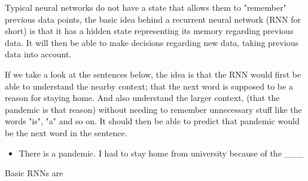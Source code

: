 
Typical neural networks do not have a state that allows them to "remember" previous data points, the basic idea behind a recurrent neural network (RNN for short) is that it has a hidden state representing its memory regarding previous data. It will then be able to make decisions regarding new data, taking previous data into account.

If we take a look at the sentences below, the idea is that the RNN would first be able to understand the nearby context; that the next word is supposed to be a reason for staying home. And also understand the larger context, (that the pandemic is that reason) without needing to remember unnecessary stuff like the words "is", "a" and so on. It should then be able to predict that pandemic would be the next word in the sentence.

\begin{itemize}
  \item There is a pandemic. I had to stay home from university because of the \_\_\_
\end{itemize}

Basic RNNs are
